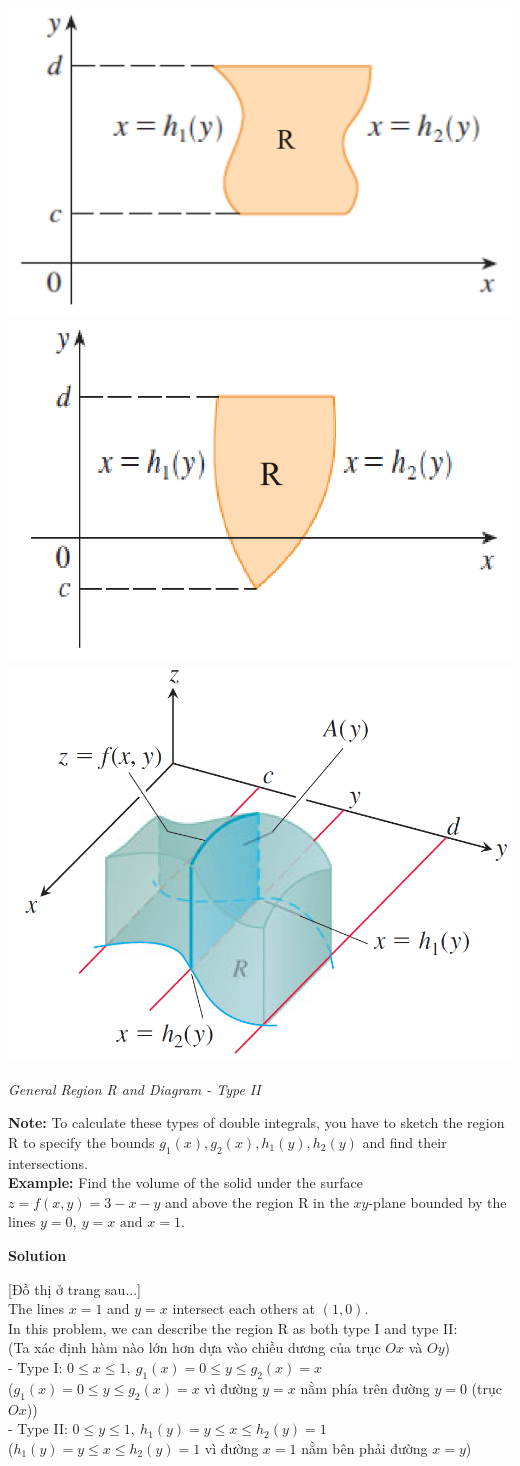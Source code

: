 \documentclass{article}
\begin{document}
\includegraphics[width=0.35\linewidth]{genre2.png}    \includegraphics[width=0.35\linewidth]{genre21.png}
\includegraphics[width=0.35\linewidth]{type2.png}
\begin{center}
    \textit{General Region R and Diagram - Type II}
\end{center}
\textbf{Note:} To calculate these types of double integrals, you have to sketch the region R to specify the bounds $g_1(x),g_2(x),h_1(y),h_2(y)$ and find their intersections.\\
\textbf{Example:} Find the volume of the solid under the surface $z=f(x,y)=3-x-y$ and above the region R in the $xy$-plane bounded by the lines $y=0,\ y=x\text{ and }x=1$.
\begin{center}
    \textbf{Solution}
\end{center}
[Đồ thị ở trang sau...]\\
The lines $x=1$ and $y=x$ intersect each others at $(1,0)$.\\
In this problem, we can describe the region R as both type I and type II:\\
(Ta xác định hàm nào lớn hơn dựa vào chiều dương của trục $Ox$ và $Oy$)\\
- Type I: $0\le x\le 1,\ g_1(x)=0\le y\le g_2(x)=x$\\ ($g_1(x)=0\le y\le g_2(x)=x$ vì đường $y=x$ nằm phía trên đường $y=0$ (trục $Ox$))\\
- Type II: $0\le y\le 1,\ h_1(y)=y\le x\le h_2(y)=1$\\ ($h_1(y)=y\le x\le h_2(y)=1$ vì đường $x=1$ nằm bên phải đường $x=y$)\\
\end{document}
